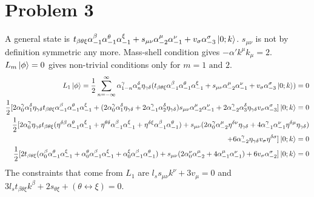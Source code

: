 \documentclass[12pt]{article}
\begin{document}
\section{Problem 3}
A general state is $t_{\beta\theta\xi}\alpha_{-1}^\beta\alpha_{-1}^\theta\alpha_{-1}^\xi+s_{\mu\nu}\alpha_{-2}^\mu\alpha_{-1}^\nu+v_\sigma\alpha_{-3}^\sigma\ket{0;k}$. $s_{\mu\nu}$ is not by definition symmetric any more. Mass-shell condition gives $-\alpha' k^\mu k_\mu=2$. $L_m\ket{\phi}=0$ gives non-trivial conditions only for $m=1\text{ and }2$.
\begin{equation}
\begin{aligned}[t]
L_1\ket{\phi}=\frac{1}{2}\sum\limits_{n=-\infty}^\infty \alpha_{1-n}^\gamma\alpha_n^\delta\eta_{\gamma\delta}(t_{\beta\theta\xi}\alpha_{-1}^\beta\alpha_{-1}^\theta\alpha_{-1}^\xi+s_{\mu\nu}\alpha_{-2}^\mu\alpha_{-1}^\nu+v_\sigma\alpha_{-3}^\sigma\ket{0;k})=0\\
\frac{1}{2}[2\alpha_{0}^\gamma\alpha_1^\delta\eta_{\gamma\delta}t_{\beta\theta\xi}\alpha_{-1}^\beta\alpha_{-1}^\theta\alpha_{-1}^\xi+(2\alpha_{0}^\gamma\alpha_1^\delta\eta_{\gamma\delta}+2\alpha_{-1}^\gamma\alpha_2^\delta\eta_{\gamma\delta})s_{\mu\nu}\alpha_{-2}^\mu\alpha_{-1}^\nu+2\alpha_{-2}^\gamma\alpha_3^\delta\eta_{\gamma\delta}v_\sigma\alpha_{-3}^\sigma]\ket{0;k}=0\\
\frac{1}{2}[2\alpha_{0}^\gamma\eta_{\gamma\delta}t_{\beta\theta\xi}(\eta^{\delta\beta}\alpha_{-1}^\theta\alpha_{-1}^\xi+\eta^{\theta\delta}\alpha_{-1}^\beta\alpha_{-1}^\xi+\eta^{\delta\xi}\alpha_{-1}^\beta\alpha_{-1}^\theta)+s_{\mu\nu}(2\alpha_{0}^\gamma\alpha_{-2}^\mu\eta^{\delta\nu}\eta_{\gamma\delta}+4\alpha_{-1}^\gamma\alpha_{-1}^\nu\eta^{\delta\mu}\eta_{\gamma\delta})\\
+6\alpha_{-2}^\gamma\eta_{\gamma\delta}v_\sigma\eta^{\delta\sigma}]\ket{0;k}=0\\
\frac{1}{2}[2t_{\beta\theta\xi}(\alpha_{0}^\beta\alpha_{-1}^\theta\alpha_{-1}^\xi+\alpha_{0}^\theta\alpha_{-1}^\beta\alpha_{-1}^\xi+\alpha_{0}^\xi\alpha_{-1}^\beta\alpha_{-1}^\theta)+s_{\mu\nu}(2\alpha_{0}^\nu\alpha_{-2}^\mu+4\alpha_{-1}^\mu\alpha_{-1}^\nu)+6v_\sigma\alpha_{-2}^\sigma]\ket{0;k}=0
\end{aligned}
\end{equation}
The constraints that come from $L_1$ are $l_s s_{\mu\nu}k^{\nu}+3v_\mu=0$ and $3l_s t_{\beta\theta\xi}k^\beta+2s_{\theta\xi}+(\theta\leftrightarrow\xi)=0$.
\end{document}
